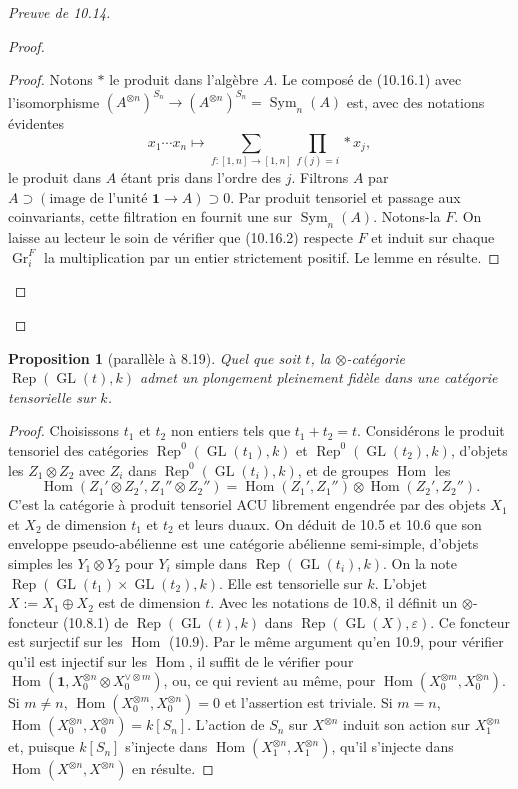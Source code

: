 \documentclass[11pt,a4paper]{article}
\theoremstyle{plain}
\newtheorem{proposition}[theorem]{Proposition}
\theoremstyle{definition}
\DeclareMathOperator{\Hom}{Hom}
\DeclareMathOperator{\Sym}{Sym}
\DeclareMathOperator{\Rep}{Rep}
\DeclareMathOperator{\GL}{GL}
\newcommand{\eps}{\varepsilon}
\DeclareMathOperator{\Gr}{Gr}
\begin{document}
\begin{proof}[Preuve de 10.14]
\begin{proof}
\begin{proof}
Notons $\ast$ le produit dans l'alg\`ebre $A$. Le compos\'e de (10.16.1) avec l'isomorphisme $(A^{\otimes n})^{S_n} \to (A^{\otimes n})^{S_n} = \Sym_n(A)$ est, avec des notations \'evidentes
\begin{equation}
x_1 \cdots x_n \longmapsto \sum_{f : [1,n] \to [1,n]} \prod_{f(j) = i} \ast x_j, \tag{10.16.2}
\end{equation}
le produit dans $A$ \'etant pris dans l'ordre des $j$. Filtrons $A$ par $A \supset (\text{image de l'unit\'e } \mathbf{1} \to A) \supset 0$. Par produit tensoriel et passage aux coinvariants, cette filtration en fournit une sur $\Sym_n(A)$. Notons-la $F$. On laisse au lecteur le soin de v\'erifier que (10.16.2) respecte $F$ et induit sur chaque $\Gr_i^F$ la multiplication par un entier strictement positif. Le lemme en r\'esulte.
\end{proof}
\end{proof}
\end{proof}

\begin{proposition}[parall\`ele \`a 8.19]
Quel que soit $t$, la $\otimes$-cat\'egorie $\Rep(\GL(t), k)$ admet un plongement pleinement fid\`ele dans une cat\'egorie tensorielle sur $k$.
\end{proposition}

\begin{proof}
Choisissons $t_1$ et $t_2$ non entiers tels que $t_1 + t_2 = t$. Consid\'erons le produit tensoriel des cat\'egories $\Rep^0(\GL(t_1), k)$ et $\Rep^0(\GL(t_2), k)$, d'objets les $Z_1 \otimes Z_2$ avec $Z_i$ dans $\Rep^0(\GL(t_i), k)$, et de groupes $\Hom$ les
\[
\Hom(Z_1' \otimes Z_2', Z_1'' \otimes Z_2'') = \Hom(Z_1', Z_1'') \otimes \Hom(Z_2', Z_2'').
\]
C'est la cat\'egorie \`a produit tensoriel ACU librement engendr\'ee par des objets $X_1$ et $X_2$ de dimension $t_1$ et $t_2$ et leurs duaux. On d\'eduit de 10.5 et 10.6 que son enveloppe pseudo-ab\'elienne est une cat\'egorie ab\'elienne semi-simple, d'objets simples les $Y_1 \otimes Y_2$ pour $Y_i$ simple dans $\Rep(\GL(t_i), k)$. On la note $\Rep(\GL(t_1) \times \GL(t_2), k)$. Elle est tensorielle sur $k$. L'objet $X := X_1 \oplus X_2$ est de dimension $t$. Avec les notations de 10.8, il d\'efinit un $\otimes$-foncteur (10.8.1) de $\Rep(\GL(t), k)$ dans $\Rep(\GL(X), \eps)$. Ce foncteur est surjectif sur les $\Hom$ (10.9). Par le m\^eme argument qu'en 10.9, pour v\'erifier qu'il est injectif sur les $\Hom$, il suffit de le v\'erifier pour $\Hom(\mathbf{1}, X_0^{\otimes n} \otimes X_0^{\vee \otimes m})$, ou, ce qui revient au m\^eme, pour $\Hom(X_0^{\otimes m}, X_0^{\otimes n})$. Si $m \neq n$, $\Hom(X_0^{\otimes m}, X_0^{\otimes n}) = 0$ et l'assertion est triviale. Si $m = n$, $\Hom(X_0^{\otimes n}, X_0^{\otimes n}) = k[S_n]$. L'action de $S_n$ sur $X^{\otimes n}$ induit son action sur $X_1^{\otimes n}$ et, puisque $k[S_n]$ s'injecte dans $\Hom(X_1^{\otimes n}, X_1^{\otimes n})$, qu'il s'injecte dans $\Hom(X^{\otimes n}, X^{\otimes n})$ en r\'esulte.
\end{proof}
\end{document}
